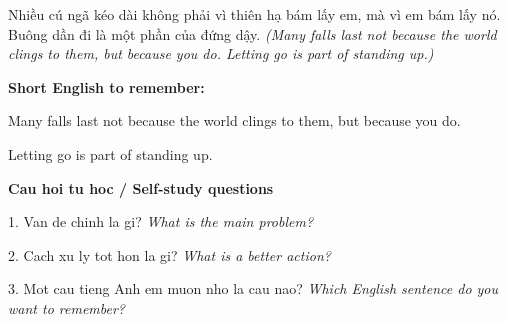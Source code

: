 \begin{baihoc}
Nhiều cú ngã kéo dài không phải vì thiên hạ bám lấy em, mà vì em bám lấy nó. Buông dần đi là một phần của đứng dậy.
\textit{(Many falls last not because the world clings to them, but because you do. Letting go is part of standing up.)}
\end{baihoc}

\begin{ghinhoanh}
\textbf{Short English to remember:}

Many falls last not because the world clings to them, but because you do.

Letting go is part of standing up.

\end{ghinhoanh}

\begin{tuhocnhanh}
\textbf{Cau hoi tu hoc / Self-study questions}

1. Van de chinh la gi? \textit{What is the main problem?}

2. Cach xu ly tot hon la gi? \textit{What is a better action?}

3. Mot cau tieng Anh em muon nho la cau nao? \textit{Which English sentence do you want to remember?}
\end{tuhocnhanh}
